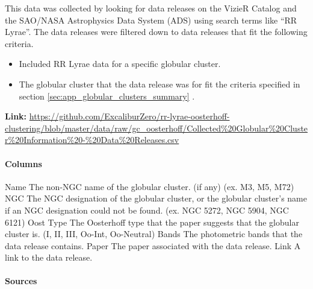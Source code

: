 \documentclass[]{article}
\begin{document}
This data was collected by looking for data releases on the VizieR Catalog and the SAO/NASA Astrophysics Data System (ADS) using search terms like “RR Lyrae”. The data releases were filtered down to data releases that fit the following criteria.

\begin{itemize}
	\item Included RR Lyrae data for a specific globular cluster.
	\item The globular cluster that the data release was for fit the criteria specified in section \ref{sec:app_globular_clusters_summary} .
\end{itemize}

\textbf{Link:} \url{https://github.com/ExcaliburZero/rr-lyrae-oosterhoff-clustering/blob/master/data/raw/gc_oosterhoff/Collected\%20Globular\%20Cluster\%20Information\%20-\%20Data\%20Releases.csv}

\paragraph{Columns}

\begin{outline}
	\1 Name
	\2 The non-NGC name of the globular cluster. (if any) (ex. M3, M5, M72)
	\1 NGC
	\2 The NGC designation of the globular cluster, or the globular cluster’s name if an NGC designation could not be found. (ex. NGC 5272, NGC 5904, NGC 6121)
	\1 Oost Type
	\2 The Oosterhoff type that the paper suggests that the globular cluster is. (I, II, III, Oo-Int, Oo-Neutral)
	\1 Bands
	\2 The photometric bands that the data release contains.
	\1 Paper
	\2 The paper associated with the data release.
	\1 Link
	\2 A link to the data release.
\end{outline}

\paragraph{Sources}
\end{document}
